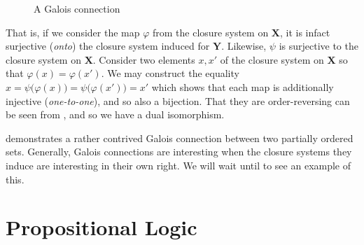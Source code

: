 \begin{figure}[H]
	\caption{A Galois connection}
	\label{figure:Galois-connection}
\end{figure}
That is, if we consider the map $\varphi$ from the closure system on $\mathbf{X}$, it is infact surjective (\textit{onto})
the closure system induced for $\mathbf{Y}$. Likewise, $\psi$ is surjective to the closure system on $\mathbf{X}$.
Consider two elements $x,x'$ of the closure system on $\mathbf{X}$ so that $\varphi(x) = \varphi(x')$. We may construct the
equality $x = \psi \big(\varphi(x)\big) = \psi\big (\varphi(x')\big) = x'$ which shows that each map is additionally injective
(\textit{one-to-one}), and so also a bijection. That they are order-reversing can be seen from
, and so we have a dual isomorphism.

 demonstrates a rather contrived Galois connection between two partially ordered sets.
Generally, Galois connections are interesting when the closure systems they induce are interesting in their own right.
We will wait until  to see an example of this.

\section{Propositional Logic}
\label{section:propositional-logic}

